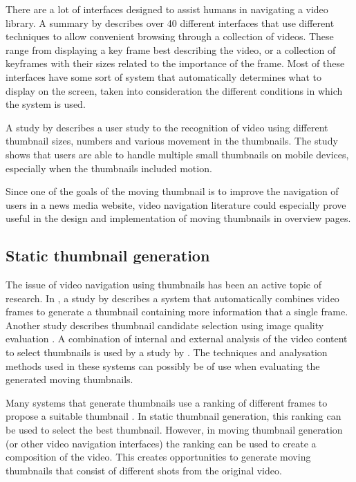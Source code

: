 \documentclass{../resources/acm_proc_article-sp}
\begin{document}
There are a lot of interfaces designed to assist humans in navigating a video library. A summary by \textcite{Schoeffmann:2010iw} describes over 40 different interfaces that use different techniques to allow convenient browsing through a collection of videos. These range from displaying a key frame best describing the video, or a collection of keyframes with their sizes related to the importance of the frame. Most of these interfaces have some sort of system that automatically determines what to display on the screen, taken into consideration the different conditions in which the system is used.

A study by \textcite{Hurst:2011jx} describes a user study to the recognition of video using different thumbnail sizes, numbers and various movement in the thumbnails. The study shows that users are able to handle multiple small thumbnails on mobile devices, especially when the thumbnails included motion.

Since one of the goals of the moving thumbnail is to improve the navigation of users in a news media website, video navigation literature could especially prove useful in the design and implementation of moving thumbnails in overview pages.

\subsection{Static thumbnail generation}

The issue of video navigation using thumbnails has been an active topic of research. In \citeyear{Kim:2015co}, a study by \textcite{Kim:2015co} describes a system that automatically combines video frames to generate a thumbnail containing more information that a single frame. Another study describes thumbnail candidate selection using image quality evaluation \cite{Zhang:2014jg}. A combination of internal and external analysis of the video content to select thumbnails is used by a study by \textcite{Liu:2015ux}. The techniques and analysation methods used in these systems can possibly be of use when evaluating the generated moving thumbnails.

Many systems that generate thumbnails use a ranking of different frames to propose a suitable thumbnail \cite{Choi:2015gm,Zhang:2012eo,Gao:2009dx}. In static thumbnail generation, this ranking can be used to select the best thumbnail. However, in moving thumbnail generation (or other video navigation interfaces) the ranking can be used to create a composition of the video. This creates opportunities to generate moving thumbnails that consist of different shots from the original video.
\end{document}
